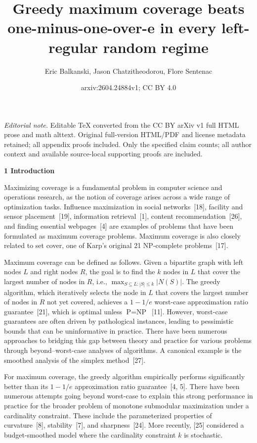 \documentclass[10pt,a4paper]{article}
\title{Greedy maximum coverage beats one-minus-one-over-e in every left-regular random regime}
\author{Eric Balkanski, Jason Chatzitheodorou, Flore Sentenac}
\date{arxiv:2604.24884v1; CC BY 4.0}
\begin{document}
\maketitle
\noindent\textit{Editorial note.} Editable TeX converted from the CC BY arXiv v1 full HTML prose and math alttext. Original full-version HTML/PDF and license metadata retained; all appendix proofs included. Only the specified claim counts; all author context and available source-local supporting proofs are included.\par\medskip


\par\medskip\noindent\textbf{1 Introduction}\par




Maximizing coverage is a fundamental problem in computer science and operations research, as the notion of coverage arises across a wide range of optimization tasks. Influence maximization in social networks [18], facility and sensor placement [19], information retrieval [1], content recommendation [26], and finding essential webpages [4] are examples of problems that have been formulated as maximum coverage problems. Maximum coverage is also closely related to set cover, one of Karp’s original 21 NP-complete problems [17].\par




Maximum coverage can be defined as follows. Given a bipartite graph with left nodes $L$ and right nodes $R$, the goal is to find the $k$ nodes in $L$ that cover the largest number of nodes in $R$, i.e., $\max_{S\subseteq L:|S|\leq k}|N(S)|$.
The greedy algorithm, which iteratively selects the node in $L$ that covers the largest number of nodes in $R$ not yet covered, achieves a $1-1/e$ worst-case approximation ratio guarantee [21], which is optimal unless $\text{P}=\text{NP}$ [11]. However, worst-case guarantees are often driven by pathological instances, leading to pessimistic bounds that can be uninformative in practice. There have been numerous approaches to bridging this gap between theory and practice for various problems through beyond–worst-case analyses of algorithms. A canonical example is the smoothed analysis of the simplex method [27].\par




For maximum coverage, the greedy algorithm empirically performs significantly better than its $1-1/e$
approximation ratio guarantee [4, 5]. There have been numerous attempts going beyond worst-case to explain this strong performance in practice for the broader problem of monotone submodular maximization under a cardinality constraint. These include the parameterized properties of curvature [8], stability [7], and sharpness [24]. More recently, [25] considered a budget-smoothed model where the cardinality constraint $k$ is stochastic.\par
\end{document}

